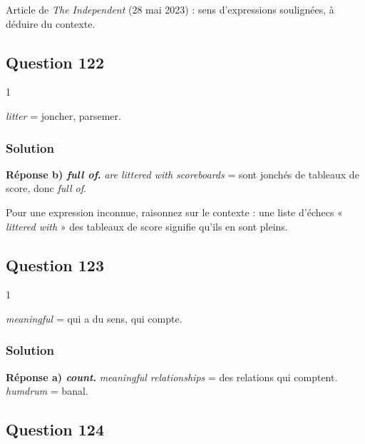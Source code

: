 \documentclass[11pt,a4paper]{article}
\begin{document}
Article de \emph{The Independent} (28 mai 2023) : sens d'expressions soulignées, à déduire du contexte.

\hypertarget{question-122}{%
\subsection{Question 122}\label{question-122}}

\begin{indication}{1}

\emph{litter} = joncher, parsemer.

\end{indication}

\hypertarget{solution-121}{%
\subsubsection{Solution}\label{solution-121}}

\textbf{Réponse b) \emph{full of}.} \emph{are littered with scoreboards} = sont jonchés de tableaux de score, donc \emph{full of}.

\begin{methode}

Pour une expression inconnue, raisonnez sur le contexte : une liste d'échecs « \emph{littered with} » des tableaux de score signifie qu'ils en sont pleins.

\end{methode}

\hypertarget{question-123}{%
\subsection{Question 123}\label{question-123}}

\begin{indication}{1}

\emph{meaningful} = qui a du sens, qui compte.

\end{indication}

\hypertarget{solution-122}{%
\subsubsection{Solution}\label{solution-122}}

\textbf{Réponse a) \emph{count}.} \emph{meaningful relationships} = des relations qui comptent. \emph{humdrum} = banal.

\hypertarget{question-124}{%
\subsection{Question 124}\label{question-124}}
\end{document}
